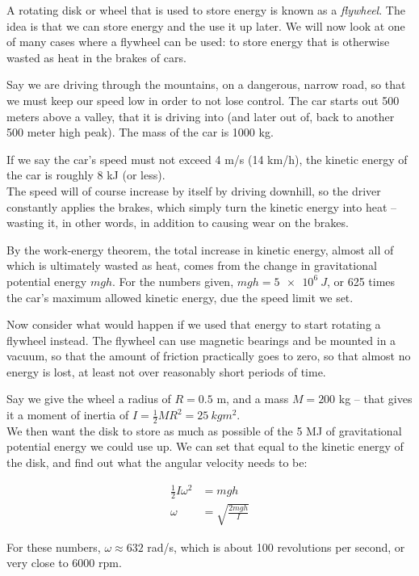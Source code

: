 A rotating disk or wheel that is used to store energy is known as a \emph{flywheel}. The idea is that we can store energy and the use it up later. We will now look at one of many cases where a flywheel can be used: to store energy that is otherwise wasted as heat in the brakes of cars.

Say we are driving through the mountains, on a dangerous, narrow road, so that we must keep our speed low in order to not lose control. The car starts out 500 meters above a valley, that it is driving into (and later out of, back to another 500 meter high peak). The mass of the car is 1000 kg.

If we say the car's speed must not exceed 4 m/s (14 km/h), the kinetic energy of the car is roughly 8 kJ (or less).\\
The speed will of course increase by itself by driving downhill, so the driver constantly applies the brakes, which simply turn the kinetic energy into heat -- wasting it, in other words, in addition to causing wear on the brakes.

By the work-energy theorem, the total increase in kinetic energy, almost all of which is ultimately wasted as heat, comes from the change in gravitational potential energy $m g h$. For the numbers given, $m g h = \SI{5e6}{J}$, or 625 times the car's maximum allowed kinetic energy, due the speed limit we set.

Now consider what would happen if we used that energy to start rotating a flywheel instead. The flywheel can use magnetic bearings and be mounted in a vacuum, so that the amount of friction practically goes to zero, so that almost no energy is lost, at least not over reasonably short periods of time.

Say we give the wheel a radius of $R = 0.5$ m, and a mass $M = 200$ kg -- that gives it a moment of inertia of $\displaystyle I = \frac{1}{2} M R^2 = \SI{25}{kg m^2}$.\\
We then want the disk to store as much as possible of the 5 MJ of gravitational potential energy we could use up. We can set that equal to the kinetic energy of the disk, and find out what the angular velocity needs to be:

\begin{align}
\frac{1}{2} I \omega^2 &= m g h\\
\omega &= \sqrt{\frac{2m g h}{I}}
\end{align}

For these numbers, $\omega \approx 632$ rad/s, which is about 100 revolutions per second, or very close to 6000 rpm.

